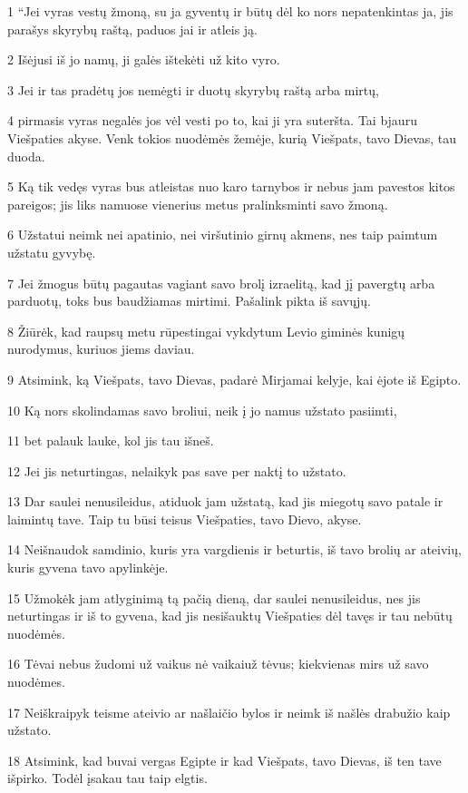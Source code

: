 \par 1 “Jei vyras vestų žmoną, su ja gyventų ir būtų dėl ko nors nepatenkintas ja, jis parašys skyrybų raštą, paduos jai ir atleis ją. 
\par 2 Išėjusi iš jo namų, ji galės ištekėti už kito vyro. 
\par 3 Jei ir tas pradėtų jos nemėgti ir duotų skyrybų raštą arba mirtų, 
\par 4 pirmasis vyras negalės jos vėl vesti po to, kai ji yra suteršta. Tai bjauru Viešpaties akyse. Venk tokios nuodėmės žemėje, kurią Viešpats, tavo Dievas, tau duoda. 
\par 5 Ką tik vedęs vyras bus atleistas nuo karo tarnybos ir nebus jam pavestos kitos pareigos; jis liks namuose vienerius metus pralinksminti savo žmoną. 
\par 6 Užstatui neimk nei apatinio, nei viršutinio girnų akmens, nes taip paimtum užstatu gyvybę. 
\par 7 Jei žmogus būtų pagautas vagiant savo brolį izraelitą, kad jį pavergtų arba parduotų, toks bus baudžiamas mirtimi. Pašalink pikta iš savųjų. 
\par 8 Žiūrėk, kad raupsų metu rūpestingai vykdytum Levio giminės kunigų nurodymus, kuriuos jiems daviau. 
\par 9 Atsimink, ką Viešpats, tavo Dievas, padarė Mirjamai kelyje, kai ėjote iš Egipto. 
\par 10 Ką nors skolindamas savo broliui, neik į jo namus užstato pasiimti, 
\par 11 bet palauk lauke, kol jis tau išneš. 
\par 12 Jei jis neturtingas, nelaikyk pas save per naktį to užstato. 
\par 13 Dar saulei nenusileidus, atiduok jam užstatą, kad jis miegotų savo patale ir laimintų tave. Taip tu būsi teisus Viešpaties, tavo Dievo, akyse. 
\par 14 Neišnaudok samdinio, kuris yra vargdienis ir beturtis, iš tavo brolių ar ateivių, kuris gyvena tavo apylinkėje. 
\par 15 Užmokėk jam atlyginimą tą pačią dieną, dar saulei nenusileidus, nes jis neturtingas ir iš to gyvena, kad jis nesišauktų Viešpaties dėl tavęs ir tau nebūtų nuodėmės. 
\par 16 Tėvai nebus žudomi už vaikus nė vaikai­už tėvus; kiekvienas mirs už savo nuodėmes. 
\par 17 Neiškraipyk teisme ateivio ar našlaičio bylos ir neimk iš našlės drabužio kaip užstato. 
\par 18 Atsimink, kad buvai vergas Egipte ir kad Viešpats, tavo Dievas, iš ten tave išpirko. Todėl įsakau tau taip elgtis. 
